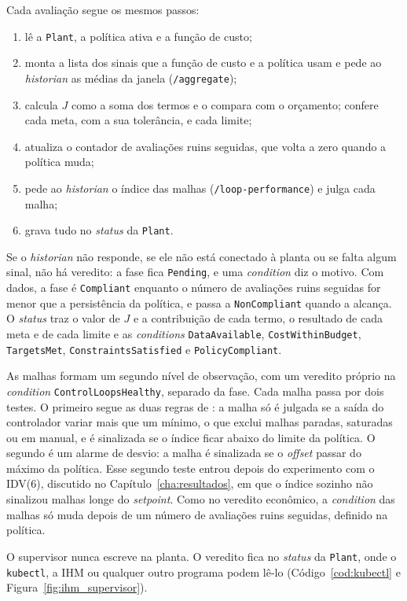 Cada avaliação segue os mesmos passos:
\begin{enumerate}
	\item lê a \texttt{Plant}, a política ativa e a função de custo;
	\item monta a lista dos sinais que a função de custo e a política usam e pede ao \textit{historian} as médias da janela (\texttt{/aggregate});
	\item calcula $J$ como a soma dos termos e o compara com o orçamento; confere cada meta, com a sua tolerância, e cada limite;
	\item atualiza o contador de avaliações ruins seguidas, que volta a zero quando a política muda;
	\item pede ao \textit{historian} o índice das malhas (\texttt{/loop-performance}) e julga cada malha;
	\item grava tudo no \textit{status} da \texttt{Plant}.
\end{enumerate}

Se o \textit{historian} não responde, se ele não está conectado à planta ou se falta algum sinal, não há veredito: a fase fica \texttt{Pending}, e uma \textit{condition} diz o motivo. Com dados, a fase é \texttt{Compliant} enquanto o número de avaliações ruins seguidas for menor que a persistência da política, e passa a \texttt{NonCompliant} quando a alcança. O \textit{status} traz o valor de $J$ e a contribuição de cada termo, o resultado de cada meta e de cada limite e as \textit{conditions} \texttt{DataAvailable}, \texttt{CostWithinBudget}, \texttt{TargetsMet}, \texttt{ConstraintsSatisfied} e \texttt{PolicyCompliant}.

As malhas formam um segundo nível de observação, com um veredito próprio na \textit{condition} \texttt{ControlLoopsHealthy}, separado da fase. Cada malha passa por dois testes. O primeiro segue as duas regras de : a malha só é julgada se a saída do controlador variar mais que um mínimo, o que exclui malhas paradas, saturadas ou em manual, e é sinalizada se o índice ficar abaixo do limite da política. O segundo é um alarme de desvio: a malha é sinalizada se o \textit{offset} passar do máximo da política. Esse segundo teste entrou depois do experimento com o IDV(6), discutido no Capítulo~\ref{cha:resultados}, em que o índice sozinho não sinalizou malhas longe do \textit{setpoint}. Como no veredito econômico, a \textit{condition} das malhas só muda depois de um número de avaliações ruins seguidas, definido na política.

O supervisor nunca escreve na planta. O veredito fica no \textit{status} da \texttt{Plant}, onde o \texttt{kubectl}, a IHM ou qualquer outro programa podem lê-lo (Código~\ref{cod:kubectl} e Figura~\ref{fig:ihm_supervisor}).

